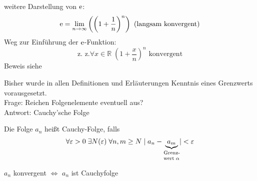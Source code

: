 %
\noindent weitere Darstellung von $\operatorname{e}$:
\begin{equation*}
  \operatorname{e} = \lim_{n \rightarrow \infty} \left( \left(1+\frac 1 n\right)^n \right)\text{ (langsam konvergent)}
\end{equation*}
%
Weg zur Einführung der $\operatorname{e}$-Funktion:
\begin{equation*}
  \text{z. z.} \forall x \in \mathbb{R}\; \left( 1 + \frac x n \right)^n \text{ konvergent}
\end{equation*}
Beweis siehe \cite[S. 32]{bornemann}

\begin{note}
  Bisher wurde in allen Definitionen und Erläuterungen Kenntnis eines Grenzwerts vorausgesetzt.\\
  Frage: Reichen Folgenelemente eventuell aus?\\
  Antwort: Cauchy'sche Folge
\end{note}

\begin{definition}
  Die Folge $a_n$ heißt Cauchy-Folge, falls
  \[ \forall \varepsilon > 0\; \exists N(\varepsilon)\; \forall n,m \geq N\; |\; a_n-\underbrace{a_m}_{\parbox{8mm}{\centering\scriptsize Grenz\-wert~$\alpha$}}\!| < \varepsilon \]
\end{definition}

\begin{proposition}
  $a_n$ konvergent $\Leftrightarrow$ $a_n$ ist Cauchyfolge
\end{proposition}


